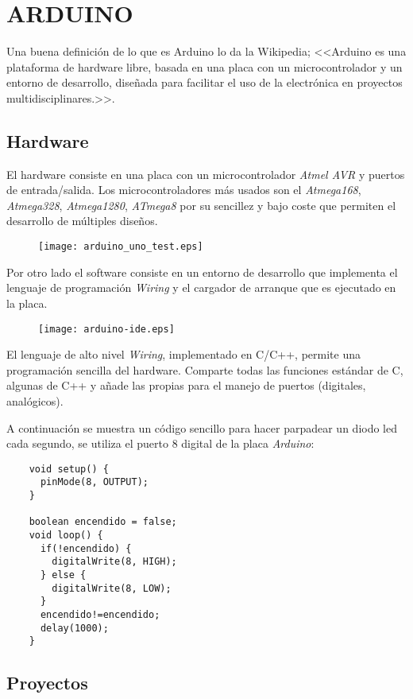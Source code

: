\section{ARDUINO}

Una buena definición de lo que es Arduino lo da la Wikipedia; <<Arduino es una plataforma de hardware libre, basada en una placa con un microcontrolador y un entorno de desarrollo, diseñada para facilitar el uso de la electrónica en proyectos multidisciplinares.>>.

\subsection{Hardware}

El hardware consiste en una placa con un microcontrolador \emph{Atmel AVR} y puertos de entrada/salida. Los microcontroladores más usados son el \emph{Atmega168}, \emph{Atmega328}, \emph{Atmega1280}, \emph{ATmega8} por su sencillez y bajo coste que permiten el desarrollo de múltiples diseños.

\begin{figure}[h!]
    \centering
    \texttt{[image: arduino\_uno\_test.eps]}
    \label{fig:arduino_uno_test}
\end{figure}


Por otro lado el software consiste en un entorno de desarrollo que implementa el lenguaje de programación \emph{Wiring} y el cargador de arranque que es ejecutado en la placa.

\begin{figure}[h!]
    \centering
    \texttt{[image: arduino-ide.eps]}
    \label{fig:arduino-ide}
\end{figure}

El lenguaje de alto nivel \emph{Wiring}, implementado en C/C++, permite una programación sencilla del hardware. Comparte todas las funciones estándar de C, algunas de C++ y añade las propias para el manejo de puertos (digitales, analógicos).

A continuación se muestra un código sencillo para hacer parpadear un diodo led cada segundo, se utiliza el puerto 8 digital de la placa \emph{Arduino}:

\begin{lstlisting}
    void setup() {
      pinMode(8, OUTPUT);
    }

    boolean encendido = false;
    void loop() {
      if(!encendido) {
        digitalWrite(8, HIGH);
      } else {
        digitalWrite(8, LOW);
      }
      encendido!=encendido;
      delay(1000);
    }
\end{lstlisting}


\subsection{Proyectos}